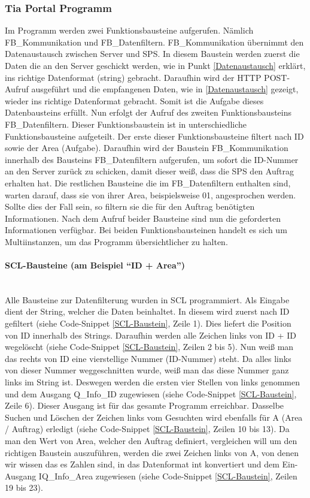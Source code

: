    \subsubsection{Tia Portal Programm}
    Im Programm werden zwei Funktionsbausteine aufgerufen. Nämlich FB\_Kommunikation und FB\_Datenfiltern. FB\_Kommunikation übernimmt den Datenaustausch zwischen Server und SPS. In diesem Baustein werden zuerst die Daten die an den Server geschickt werden, wie in Punkt \ref{Datenaustausch} erklärt, ins richtige Datenformat (string) gebracht. Daraufhin wird der HTTP POST-Aufruf ausgeführt und die empfangenen Daten, wie in \ref{Datenaustausch} gezeigt, wieder ins richtige Datenformat gebracht. Somit ist die Aufgabe dieses Datenbausteins erfüllt. Nun erfolgt der Aufruf des zweiten Funktionsbausteins FB\_Datenfiltern. Dieser Funktionsbaustein ist in unterschiedliche Funktionsbausteine aufgeteilt. Der erste dieser Funktionsbausteine filtert nach ID sowie der Area (Aufgabe). Daraufhin wird der Baustein FB\_Kommunikation innerhalb des Bausteins FB\_Datenfiltern aufgerufen, um sofort die ID-Nummer an den Server zurück zu schicken, damit dieser weiß, dass die SPS den Auftrag erhalten hat. Die restlichen Bausteine die im FB\_Datenfiltern enthalten sind, warten darauf, dass sie von ihrer Area, beispielsweise 01, angesprochen werden. Sollte dies der Fall sein, so filtern sie die für den Auftrag benötigten Informationen. Nach dem Aufruf beider Bausteine sind nun die geforderten Informationen verfügbar. Bei beiden Funktionsbausteinen handelt es sich um Multiinstanzen, um das Programm übersichtlicher zu halten. 

    \paragraph{SCL-Bausteine (am Beispiel \enquote{ID + Area})} 
    \mbox{} \\
    Alle Bausteine zur Datenfilterung wurden in SCL programmiert. Als Eingabe dient der String, welcher die Daten beinhaltet. In diesem wird zuerst nach ID gefiltert (siehe Code-Snippet \ref{SCL-Baustein}, Zeile 1). Dies liefert die Position von ID innerhalb des Strings. Daraufhin werden alle Zeichen links von ID + ID wegelöscht (siehe Code-Snippet \ref{SCL-Baustein}, Zeilen 2 bis 5). Nun weiß man das rechts von ID eine vierstellige Nummer (ID-Nummer) steht. Da alles links von dieser Nummer weggeschnitten wurde, weiß man das diese Nummer ganz links im String ist. Deswegen werden die ersten vier Stellen von links genommen und dem Ausgang Q\_Info\_ID zugewiesen (siehe Code-Snippet \ref{SCL-Baustein}, Zeile 6). Dieser Ausgang ist für das gesamte Programm erreichbar. Dasselbe Suchen und Löschen der Zeichen links vom Gesuchten wird ebenfalls für A (Area / Auftrag) erledigt (siehe Code-Snippet \ref{SCL-Baustein}, Zeilen 10 bis 13). Da man den Wert von Area, welcher den Auftrag definiert, vergleichen will um den richtigen Baustein auszuführen, werden die zwei Zeichen links von A, von denen wir wissen das es Zahlen sind, in das Datenformat int konvertiert und dem Ein-Ausgang IQ\_Info\_Area zugewiesen (siehe Code-Snippet \ref{SCL-Baustein}, Zeilen 19 bis 23). \\

